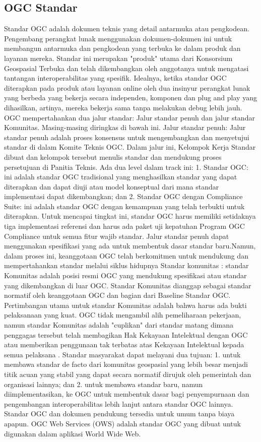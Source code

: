 \subsection{OGC Standar}
\cite{lupp2008open} Standar OGC adalah dokumen teknis yang detail antarmuka atau pengkodean. Pengembang perangkat lunak menggunakan dokumen-dokumen ini untuk membangun antarmuka dan pengkodean yang terbuka ke dalam produk dan layanan mereka. Standar ini merupakan "produk" utama dari Konsorsium Geospasial Terbuka dan telah dikembangkan oleh anggotanya untuk mengatasi tantangan interoperabilitas yang spesifik. Idealnya, ketika standar OGC diterapkan pada produk atau layanan online oleh dua insinyur perangkat lunak yang berbeda yang bekerja secara independen, komponen dan plug and play yang dihasilkan, artinya, mereka bekerja sama tanpa melakukan debug lebih jauh.
OGC mempertahankan dua jalur standar: Jalur standar penuh dan jalur standar Komunitas. Masing-masing diringkas di bawah ini.
Jalur standar penuh: Jalur standar penuh adalah proses konsensus untuk mengembangkan dan menyetujui standar di dalam Komite Teknis OGC. Dalam jalur ini, Kelompok Kerja Standar dibuat dan kelompok tersebut menulis standar dan mendukung proses persetujuan di Panitia Teknis. Ada dua level dalam track ini:
1.	Standar OGC: ini adalah standar OGC tradisional yang menghasilkan standar yang dapat diterapkan dan dapat diuji atau model konseptual dari mana standar implementasi dapat dikembangkan; dan
2.	Standar OGC dengan Compliance Suite: ini adalah standar OGC dengan kemampuan yang telah terbukti untuk diterapkan. Untuk mencapai tingkat ini, standar OGC harus memiliki setidaknya tiga implementasi referensi dan harus ada paket uji kepatuhan Program OGC Compliance untuk semua fitur wajib standar.
Jalur standar penuh dapat menggunakan spesifikasi yang ada untuk membentuk dasar standar baru.Namun, dalam proses ini, keanggotaan OGC telah berkomitmen untuk mendukung dan mempertahankan standar melalui siklus hidupnya
Standar komunitas : standar Komunitas adalah posisi resmi OGC yang mendukung spesifikasi atau standar yang dikembangkan di luar OGC. Standar Komunitas dianggap sebagai standar normatif oleh keanggotaan OGC dan bagian dari Baseline Standar OGC. Pertimbangan utama untuk standar Komunitas adalah bahwa harus ada bukti pelaksanaan yang kuat. OGC tidak mengambil alih pemeliharaan pekerjaan, namun standar Komunitas adalah "cuplikan" dari standar matang dimana penggagas tersebut telah membagikan Hak Kekayaan Intelektual dengan OGC atau memberikan penggunaan tak terbatas atas Kekayaan Intelektual kepada semua pelaksana .
Standar masyarakat dapat melayani dua tujuan:
1.	untuk membawa standar de facto dari komunitas geospasial yang lebih besar menjadi titik acuan yang stabil yang dapat secara normatif dirujuk oleh pemerintah dan organisasi lainnya; dan
2.	untuk membawa standar baru, namun diimplementasikan, ke OGC untuk membentuk dasar bagi penyempurnaan dan pengembangan interoperabilitas lebih lanjut antara standar OGC lainnya.
Standar OGC dan dokumen pendukung tersedia untuk umum tanpa biaya apapun.
OGC Web Services (OWS) adalah standar OGC yang dibuat untuk digunakan dalam aplikasi World Wide Web.

